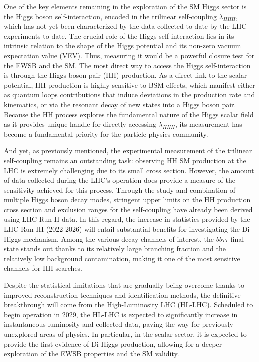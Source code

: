 One of the key elements remaining in the exploration of the SM Higgs sector is the Higgs boson self-interaction, encoded in the trilinear self-coupling $\lambda_{HHH}$, which has not yet been characterized by the data collected to date by the LHC experiments to date. The crucial role of the Higgs self-interaction lies in its intrinsic relation to the shape of the Higgs potential and its non-zero vacuum expectation value (VEV). Thus, measuring it would be a powerful closure test for the EWSB and the SM. The most direct way to access the Higgs self-interaction is through the Higgs boson pair (HH) production. As a direct link to the scalar potential, HH production is highly sensitive to BSM effects, which manifest either as quantum loops contributions that induce deviations in the production rate and kinematics, or via the resonant decay of new states into a Higgs boson pair. Because the HH process explores the fundamental nature of the Higgs scalar field as it provides unique handle for directly accessing $\lambda_{HHH}$, its measurement has become a fundamental priority for the particle physics community. 
    
And yet, as previously mentioned, the experimental measurement of the trilinear self-coupling remains an outstanding task: observing HH SM production at the LHC is extremely challenging due to its small cross section. However, the amount of data collected during the LHC's operation does provide a measure of the sensitivity achieved for this process. Through the study and combination of multiple Higgs boson decay modes, stringent upper limits on the HH production cross section and exclusion ranges for the self-coupling have already been derived using LHC Run II data. In this regard, the increase in statistics provided by the LHC Run III (2022-2026) will entail substantial benefits for investigating the Di-Higgs mechanism. Among the various decay channels of interest, the $bb\tau\tau$ final state stands out thanks to its relatively large branching fraction and the relatively low background contamination, making it one of the most sensitive channels for HH searches. 

Despite the statistical limitations that are gradually being overcome thanks to improved reconstruction techniques and identification methods, the definitive breakthrough will come from the High-Luminosity LHC (HL-LHC). Scheduled to begin operation in 2029, the HL-LHC is expected to significantly increase in instantaneous luminosity and collected data, paving the way for previously unexplored areas of physics. In particular, in the scalar sector, it is expected to provide the first evidence of Di-Higgs production, allowing for a deeper exploration of the EWSB properties and the SM validity.

